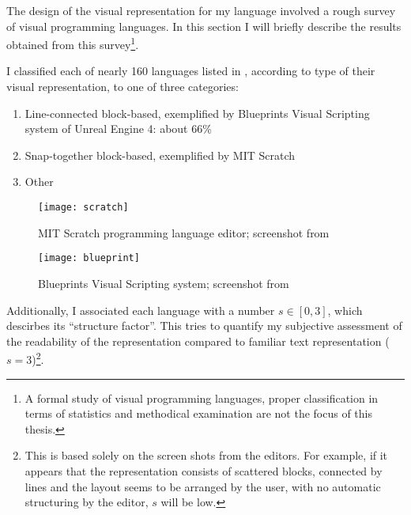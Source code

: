 The design of the visual representation for my language involved a rough survey
of visual programming languages. In this section I will briefly describe the
results obtained from this survey\footnote{A formal study of visual programming
  languages, proper classification in terms of statistics and methodical
  examination are not the focus of this thesis. }.

I classified each of nearly 160 languages listed in \cite{snapshots}, according
to type of their visual representation, to one of three categories:
\begin{enumerate}
    \item Line-connected block-based, exemplified by Blueprints Visual
    Scripting system of Unreal Engine 4\cite{blueprint}: about 66\%
    \item Snap-together block-based, exemplified by MIT Scratch\cite{scratch, scratch_wikipedia}
    \item Other
\end{enumerate}


\begin{figure}[h!]
\centering \texttt{[image: scratch]}
\caption{
    MIT Scratch programming language editor;
    screenshot from \protect\cite{fig_scratch}
}
\label{fig:scratch}
\end{figure}

\begin{figure}[h!]
\centering \texttt{[image: blueprint]}
\caption{
    Blueprints Visual Scripting system;
    screenshot from \protect\cite{fig_blueprint}
}
\label{fig:blueprint}
\end{figure}


Additionally, I associated each language with a number $s \in [0, 3]$, which
descirbes its ``structure factor''. This tries to quantify my subjective
assessment of the readability of the representation compared to familiar text
representation ($s = 3$)\footnote{This is based solely on the screen shots from
  the editors. For example, if it appears that the representation consists of
  scattered blocks, connected by lines and the layout seems to be arranged by
  the user, with no automatic structuring by the editor, $s$ will be low.}.

